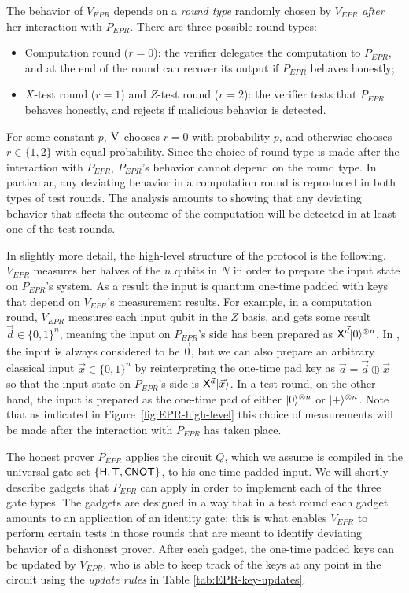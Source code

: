 The behavior of $V_{EPR}$ depends on a \emph{round type} randomly chosen by $V_{EPR}$ {\em after} her interaction with $P_{EPR}$. There are three possible round types:
\begin{itemize}[nolistsep]
\item Computation round ($r=0$): the verifier delegates the computation to $P_{EPR}$, and at the end of the round can recover its output if $P_{EPR}$ behaves honestly;
\item $X$-test round ($r=1$) and $Z$-test round ($r=2$): the verifier tests that  $P_{EPR}$  behaves honestly, and rejects if malicious behavior is detected.
\end{itemize}
For some constant $p$, $\textsc{V}$ chooses $r=0$ with probability $p$, and otherwise chooses $r\in\{1,2\}$ with equal probability. Since the choice of round type is made after the interaction with $P_{EPR}$, $P_{EPR}$'s behavior cannot depend on the round type. In particular, any deviating behavior in a computation round is reproduced in both types of test rounds. The analysis amounts to showing that any deviating behavior that affects the outcome of the computation will be detected in at least one of the test rounds. 

In slightly more detail, the high-level structure of the protocol is the following. $V_{EPR}$ measures her halves of the $n$ qubits in $N$ in order to prepare the input state on $P_{EPR}$'s system. As a result the input is quantum one-time padded with keys that depend on $V_{EPR}$'s measurement results. For example, in a computation round, $V_{EPR}$ measures each input qubit in the $Z$ basis, and gets some result $\vec{d}\in\{0,1\}^n$, meaning the input on $P_{EPR}$'s side has been prepared as ${\sf X}^{\vec{d}}|0\rangle^{\otimes n}$. In \cite{broadbent15howtoverify}, the input is always considered to be $\vec{0}$, but we can also prepare an arbitrary classical input $\vec{x}\in\{0,1\}^n$ by reinterpreting the one-time pad key as $\vec{a}=\vec{d}\oplus \vec{x}$ so that the input state on $P_{EPR}$'s side is ${\sf X}^{\vec{a}}|\vec{x}\rangle$. In a test round, on the other hand, the input is prepared as the one-time pad of either $|0\rangle^{\otimes n}$ or $|+\rangle^{\otimes n}$. Note that as indicated in Figure~\ref{fig:EPR-high-level} this choice of measurements will be made after the interaction with $P_{EPR}$ has taken place.

The honest prover $P_{EPR}$ applies the circuit $Q$, which we assume is compiled in the universal gate set $\{{\sf H},{\sf T},{\sf CNOT}\}$, to his one-time padded input. We will shortly describe gadgets that $P_{EPR}$ can apply in order to implement each of the three gate types. The gadgets are designed in a way that in a test round each gadget amounts to an application of an identity gate; this is what enables $V_{EPR}$ to perform certain tests in those rounds that are meant to identify deviating behavior of a dishonest prover. After each gadget, the one-time padded keys can be updated by $V_{EPR}$, who is able to keep track of the keys at any point in the circuit using the \emph{update rules} in Table \ref{tab:EPR-key-updates}. 

